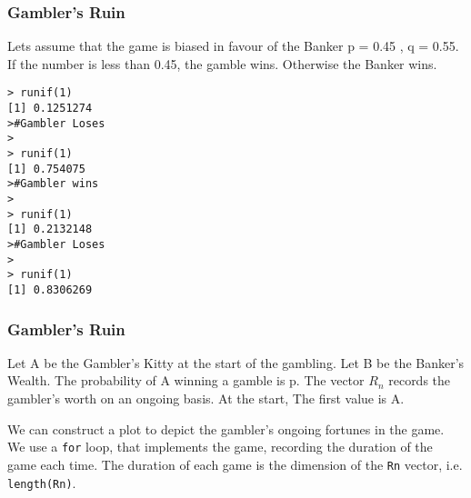 \begin{frame}
	\frametitle{Gambler's Ruin}
Lets assume that the game is biased in favour of the Banker
p = 0.45 , q = 0.55.
If the number is less than 0.45, the gamble wins. Otherwise the Banker wins.

\begin{verbatim}
> runif(1)
[1] 0.1251274
>#Gambler Loses
>
> runif(1)
[1] 0.754075
>#Gambler wins
>
> runif(1)
[1] 0.2132148
>#Gambler Loses
>
> runif(1)
[1] 0.8306269
\end{verbatim}

\end{frame}
\begin{frame}
	\frametitle{Gambler's Ruin}
Let A be the Gambler's Kitty at the start of the gambling.
Let B be the Banker's Wealth.
The probability of A winning a gamble is p.
The vector $R_n$ records the gambler's worth on an ongoing basis. At the start, The first value is A.
We can construct a plot to depict the gambler's ongoing fortunes in the game. We use a \texttt{for} loop, that implements the game, recording the duration of the game each time. The duration of each game is the dimension of the \texttt{Rn} vector, i.e. \texttt{length(Rn)}.


\end{frame}
